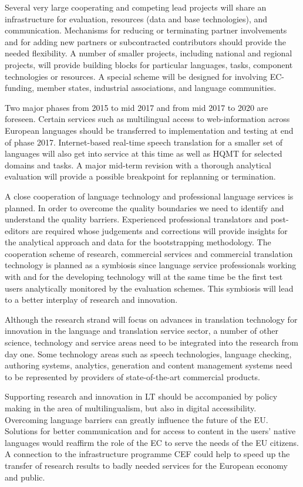 \documentclass[10pt, plain]{../../metanetpaper}
\begin{document}
\begin{multicols}{2}
Several very large cooperating and competing lead projects will share an infrastructure for evaluation, resources (data and base technologies), and communication. Mechanisms for reducing or terminating partner involvements and for adding new partners or subcontracted contributors should provide the needed flexibility. A number of smaller projects, including national and regional projects, will provide building blocks for particular languages, tasks, component technologies or resources. A special scheme will be designed for involving EC-funding, member states, industrial associations, and language communities.
 
Two major phases from 2015 to mid 2017 and from mid 2017 to 2020 are foreseen. Certain services such as multilingual access to web-information across European languages should be transferred to implementation and testing at end of phase 2017. Internet-based real-time speech translation for a smaller set of languages will also get into service at this time as well as HQMT for selected domains and tasks. A major mid-term revision with a thorough analytical evaluation will provide a possible breakpoint for replanning or termination.
 
A close cooperation of language technology and professional language services is planned. In order to overcome the quality boundaries we need to identify and understand the quality barriers. Experienced professional translators and post-editors are required whose judgements and corrections will provide insights for the analytical approach and data for the bootstrapping methodology. The cooperation scheme of research, commercial services and commercial translation technology is planned as a symbiosis since language service professionals working with and for the developing technology will at the same time be the first test users analytically monitored by the evaluation schemes. This symbiosis will lead to a better interplay of research and innovation.

Although the research strand will focus on advances in translation technology for innovation in the language and translation service sector, a number of other science, technology and service areas need to be integrated into the research from day one. Some technology areas such as speech technologies, language checking, authoring systems, analytics, generation and content management systems need to be represented by providers of state-of-the-art commercial products.
 
Supporting research and innovation in LT should be accompanied by policy making in the area of multilingualism, but also in digital accessibility. Overcoming language barriers can greatly influence the future of the EU. Solutions for better communication and for access to content in the users' native languages would reaffirm the role of the EC to serve the needs of the EU citizens. A connection to the infrastructure programme CEF could help to speed up the transfer of research results to badly needed services for the European economy and public.


\end{multicols}
\end{document}
